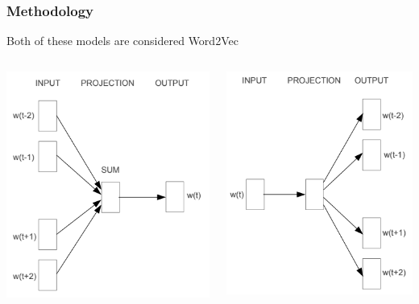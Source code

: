 \documentclass[aspectratio=169]{beamer}
\begin{document}
\begin{frame}
\frametitle{Methodology}

Both of these models are considered Word2Vec

\begin{columns}
\begin{column}{0.5\textwidth}

\includegraphics[scale=0.45]{cbow.png}

\end{column}

\begin{column}{0.5\textwidth}
\includegraphics[scale=0.45]{csg.png}
\end{column}

\end{columns}

\end{frame}
\end{document}
